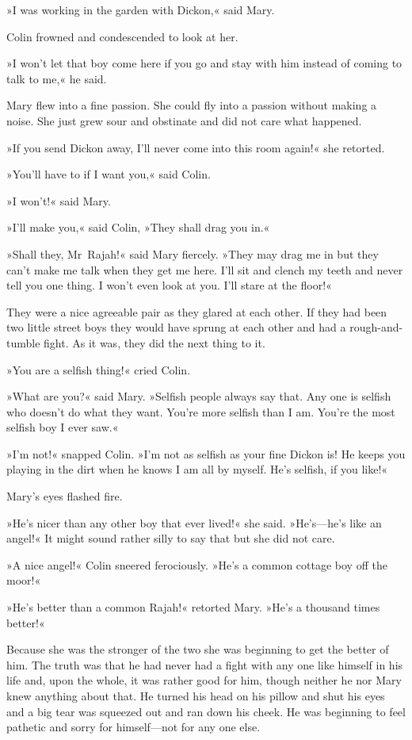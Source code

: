 »I was working in the garden with Dickon,« said Mary.

Colin frowned and condescended to look at her.

»I won't let that boy come here if you go and stay with him instead of coming to talk to me,« he said.

Mary flew into a fine passion. She could fly into a passion without making a noise. She just grew sour and obstinate and did not care what happened.

»If you send Dickon away, I'll never come into this room again!« she retorted.

»You'll have to if I want you,« said Colin.

»I won't!« said Mary.

»I'll make you,« said Colin, »They shall drag you in.«

»Shall they, Mr~Rajah!« said Mary fiercely. »They may drag me in but they can't make me talk when they get me here. I'll sit and clench my teeth and never tell you one thing. I won't even look at you. I'll stare at the floor!«

They were a nice agreeable pair as they glared at each other. If they had been two little street boys they would have sprung at each other and had a rough-and-tumble fight. As it was, they did the next thing to it.

»You are a selfish thing!« cried Colin.

»What are you?« said Mary. »Selfish people always say that. Any one is selfish who doesn't do what they want. You're more selfish than I am. You're the most selfish boy I ever saw.«

»I'm not!« snapped Colin. »I'm not as selfish as your fine Dickon is! He keeps you playing in the dirt when he knows I am all by myself. He's selfish, if you like!«

Mary's eyes flashed fire.

»He's nicer than any other boy that ever lived!« she said. »He's—he's like an angel!« It might sound rather silly to say that but she did not care.

»A nice angel!« Colin sneered ferociously. »He's a common cottage boy off the moor!«

»He's better than a common Rajah!« retorted Mary. »He's a thousand times better!«

Because she was the stronger of the two she was beginning to get the better of him. The truth was that he had never had a fight with any one like himself in his life and, upon the whole, it was rather good for him, though neither he nor Mary knew anything about that. He turned his head on his pillow and shut his eyes and a big tear was squeezed out and ran down his cheek. He was beginning to feel pathetic and sorry for himself—not for any one else.

